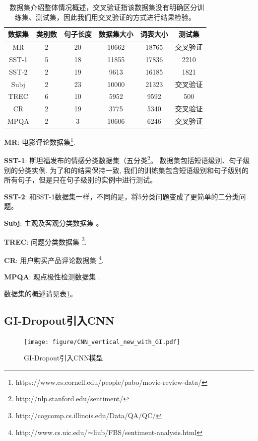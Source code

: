 \begin{table}[!t]
\centering
\begin{tabular}{c c c c c c}
\hline
\bfseries 数据集 & 类别数 & 句子长度 & 数据集大小 & 词表大小  & 测试集\\
\hline
MR & 2 & 20 & 10662 & 18765 &  交叉验证\\
SST-1 & 5 & 18 & 11855 & 17836  & 2210\\
SST-2 & 2 & 19 & 9613 & 16185  & 1821\\
Subj & 2 & 23 & 10000 & 21323  & 交叉验证\\
TREC & 6 & 10 & 5952 & 9592  & 500\\
CR & 2 & 19 & 3775 & 5340  & 交叉验证\\
MPQA & 2 & 3 & 10606 & 6246 & 交叉验证\\
\hline
\end{tabular}
\caption{\ 数据集介绍整体情况概述，交叉验证指该数据集没有明确区分训练集、测试集，因此我们用交叉验证的方式进行结果检验。}
\label{table: dataset summary}
\end{table}

\textbf{MR}: 电影评论数据集\footnote{https://www.cs.cornell.edu/people/pabo/movie-review-data/}.

\textbf{SST-1}: 斯坦福发布的情感分类数据集（五分类\citep{socher2013recursive}\footnote{http://nlp.stanford.edu/sentiment/}。 数据集包括短语级别、句子级别的分类实例. 为了和\citep{kim2014convolutional}的结果保持一致,  我们的训练集包含短语级别和句子级别的所有句子，但是只在句子级别的实例中进行测试。

\textbf{SST-2}: 和SST-1数据集一样，不同的是，将5分类问题变成了更简单的二分类问题。

\textbf{Subj}: 主观及客观分类数据集 \citep{pang2005seeing}。

\textbf{TREC}: 问题分类数据集 \citep{li2002learning} \footnote{http://cogcomp.cs.illinois.edu/Data/QA/QC/}.

\textbf{CR}: 用户购买产品评论数据集 \citep{hu2004mining} \footnote{http://www.cs.uic.edu/∼liub/FBS/sentiment-analysis.html}.

\textbf{MPQA}: 观点极性检测数据集 \citep{wiebe2005annotating}.

数据集的概述请见表\ref{table: dataset summary}。
\subsection{GI-Dropout引入CNN}
\begin{figure}[!t]
\centering
  \texttt{[image: figure/CNN\_vertical\_new\_with\_GI.pdf]}
  \caption{GI-Dropout引入CNN模型}
  \label{fig: cnn}
\end{figure}

